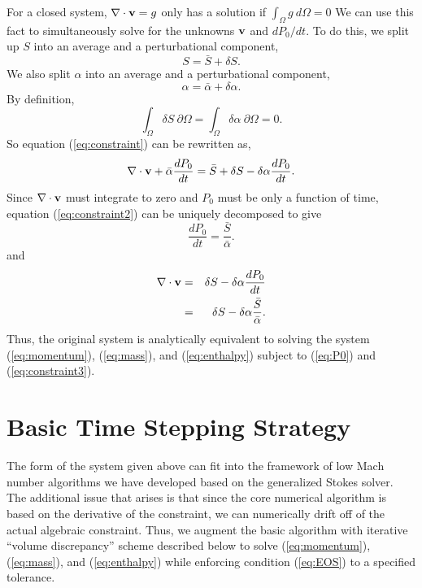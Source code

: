 \documentclass[final]{siamltex}
\def\vb {{\bf v}}
\begin{document}
For a closed system, $\nabla \cdot \vb = g$ only has a solution if $\int_\Omega g~d\Omega = 0$
We can use this fact to simultaneously solve for the unknowns
$\vb$ and $dP_0/dt$.
To do this, we split up $S$ into an average and a perturbational component,
\begin{equation}
S = \bar{S} + \delta S.
\end{equation}
We also
split $\alpha$ into an average and a perturbational component,
\begin{equation}
\alpha = \bar{\alpha} + \delta\alpha.
\end{equation}
By definition,
\begin{equation}
\int_{\Omega} \delta S ~\partial\Omega = \int_{\Omega} \delta \alpha ~\partial\Omega = 0.\label{eq:zero int}
\end{equation}
So equation (\ref{eq:constraint}) can be rewritten as,
\begin{equation}
\nabla\cdot\vb + \bar{\alpha}\frac{d P_0}{d t} 
= \bar{S} + \delta S -
\delta\alpha\frac{d P_0}{d t}.\label{eq:constraint2}
\end{equation}
Since $\nabla \cdot \vb$ must integrate to zero and $P_0$ must be only a function of time,
equation (\ref{eq:constraint2}) can be uniquely decomposed to give
\begin{equation}
\frac{dP_0}{dt} = \frac{\bar{S}}{\bar{\alpha}}.\label{eq:P0}
\end{equation}
and
\begin{eqnarray}
\nabla\cdot\vb &=& \delta S - \delta\alpha\frac{dP_0}{dt} \nonumber\\
&=& \delta S - \delta\alpha\frac{\bar{S}}{\bar{\alpha}}.\label{eq:constraint3}
\end{eqnarray}
Thus, the original system is analytically equivalent to solving the system (\ref{eq:momentum}), (\ref{eq:mass}), and (\ref{eq:enthalpy})
subject to (\ref{eq:P0}) and (\ref{eq:constraint3}).

\section{Basic Time Stepping Strategy}

The form of the system given above can fit into the framework of low Mach number algorithms we have
developed based on the generalized Stokes solver. 
The additional issue that arises is that since the core numerical algorithm is based on the derivative
of the constraint, we can numerically drift off of the actual algebraic constraint. Thus, we augment the
basic algorithm with iterative 
``volume discrepancy'' scheme described below to solve 
(\ref{eq:momentum}), (\ref{eq:mass}), and (\ref{eq:enthalpy})
while enforcing condition (\ref{eq:EOS}) to a specified tolerance.\\
\end{document}
